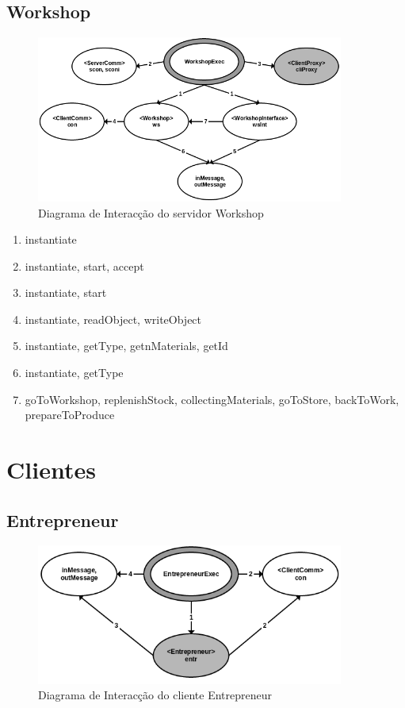 \documentclass[11pt,a4paper]{report}
\begin{document}
\subsection{Workshop}

\begin{figure}[h]
    \centering
    \includegraphics[width=0.9\textwidth]{images/workshop.png}
    \caption{Diagrama de Interacção do servidor Workshop}
    \label{fig:awesome_image}
\end{figure}

\begin{enumerate}
\itemsep-0.4em 
\item instantiate
\item instantiate, start, accept
\item instantiate, start
\item instantiate, readObject, writeObject
\item instantiate, getType, getnMaterials, getId
\item instantiate, getType
\item goToWorkshop, replenishStock, collectingMaterials, goToStore, backToWork, prepareToProduce
\end{enumerate}
\newpage
\section{Clientes}

\subsection{Entrepreneur}

\begin{figure}[h]
    \centering
    \includegraphics[width=0.9\textwidth]{images/entrepreneur.png}
    \caption{Diagrama de Interacção do cliente Entrepreneur}
    \label{fig:awesome_image}
\end{figure}
\end{document}
